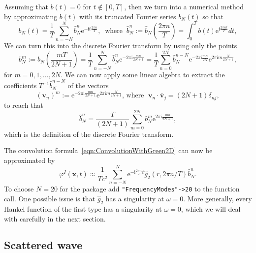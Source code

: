 \documentclass[ 12pt, a4paper]{article}
\newcommand{\be}{\begin{equation}}
\newcommand{\en}{\end{equation}}
\newcommand{\ii}{\textrm{i}}
\newcommand{\ee}{\textrm{e}}
\renewcommand{\vec}[1]{\boldsymbol{#1}}
\begin{document}
Assuming that $b(t) = 0$ for $t \not \in [0, T]$, then we turn into a numerical method by approximating $b(t)$ with its truncated Fourier series $b_N(t)$ so that
\be
b_N(t) = \frac{1}{T} \sum_{n = -N}^{ N} \hat b_N^n \ee^{- \ii t \frac{2 \pi n}{T}}, \;\; \text{where} \;\; \hat b_N^n := \hat b_N\left (\frac{2 \pi n}{T}\right ) =  \int_0^T b(t) \ee^{\ii \frac{2 \pi n t}{T}} dt,
\en
 We can turn this into the discrete Fourier transform by using only the points
\be
b_N^m := b_N \left (\frac{m T}{2N +1}\right )= \frac{1}{T} \sum_{n = -N}^{ N} \hat b^n_N \ee^{-2 \pi  \ii  \frac{ m n}{2N +1}} =  \frac{1}{T} \sum_{n = 0}^{ 2 N}  \hat b^{n- N}_N  \ee^{-2 \pi  \ii  \frac{ m n}{2 N}}   \ee^{2 \pi  \ii m  \frac{N}{2 N +1}},
\en
for $m= 0, 1, \ldots, 2 N$. We can now apply some linear algebra to extract the coefficients $T^{-1}\hat b^{n- N}_N$ of the vectors
\be
(\vec v_n)^m:=  \ee^{-2 \pi  \ii  \frac{ m n }{2 N + 1}} \ee^{2 \pi  \ii m  \frac{N}{2 N +1}} \text{, where } \; \vec v_n \cdot \bar{\vec v}_j = (2 N +1) \delta_{nj},
\en
to reach that
\be
\hat b^{n}_N  = \frac{T}{(2 N +1)} \sum_{m=0}^{2 N} b_N^m \ee^{2 \pi  \ii  \frac{ m n }{2 N + 1}},
\en
which is the definition of the discrete Fourier transform.

The convolution formula~\eqref{eqn:ConvolutionWithGreen2D} can now be approximated by
\be
\varphi^I(\vec x,t) \approx \frac{1}{T c^2}   \sum_{n = - N}^N \ee^{-\ii \frac { 2 \pi n }{T} t}  \hat g_2(r ,2 \pi n /T) \hat b_N^n   .
\label{eqn:ConvolutionWithGreen2DN}
\en
To choose $N=20$ for the package add \texttt{"FrequencyModes"->20} to the function call. One possible issue is that $\hat g_2$ has a singularity at $\omega =0$. More generally, every Hankel function of the first type has a singularity at $\omega =0$,  which we will deal with carefully in the next section.

\subsection{Scattered wave}
\end{document}
